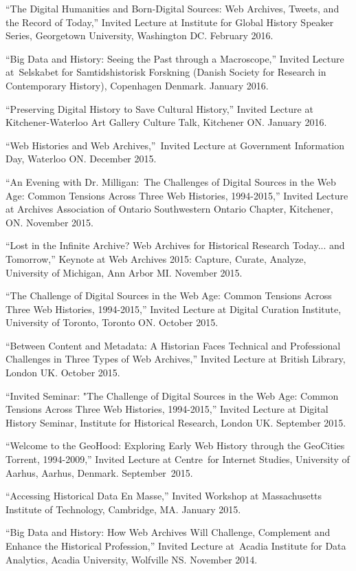 \documentclass[11pt,article,oneside]{memoir}
\begin{document}
\ind ``The Digital Humanities and Born-Digital Sources: Web Archives, Tweets, and the Record of Today,'' Invited Lecture at Institute for Global History Speaker Series, Georgetown University, Washington DC. February 2016.

\ind ``Big Data and History: Seeing the Past through a Macroscope,'' Invited Lecture at Selskabet for Samtidshistorisk Forskning (Danish Society for Research in Contemporary History), Copenhagen Denmark. January 2016. 

\ind ``Preserving Digital History to Save Cultural History,'' Invited Lecture at Kitchener-Waterloo Art Gallery Culture Talk, Kitchener ON. January 2016.

\ind ``Web Histories and Web Archives,'' Invited Lecture at Government Information Day, Waterloo ON. December 2015.

\ind ``An Evening with Dr. Milligan: The Challenges of Digital Sources in the Web Age: Common Tensions Across Three Web Histories, 1994-2015,'' Invited Lecture at Archives Association of Ontario Southwestern Ontario Chapter, Kitchener, ON. November 2015.

\ind ``Lost in the Infinite Archive? Web Archives for Historical Research Today... and Tomorrow,'' Keynote at Web Archives 2015: Capture, Curate, Analyze, University of Michigan, Ann Arbor MI. November 2015.

\ind ``The Challenge of Digital Sources in the Web Age: Common Tensions Across Three Web Histories, 1994-2015,'' Invited Lecture at Digital Curation Institute, University of Toronto, Toronto ON. October 2015.

\ind ``Between Content and Metadata: A Historian Faces Technical and Professional Challenges in Three Types of Web Archives,'' Invited Lecture at British Library, London UK. October 2015.

\ind ``Invited Seminar: "The Challenge of Digital Sources in the Web Age: Common Tensions Across Three Web Histories, 1994-2015,'' Invited Lecture at Digital History Seminar, Institute for Historical Research, London UK. September 2015. 

\ind ``Welcome to the GeoHood: Exploring Early Web History through the GeoCities Torrent, 1994-2009,'' Invited Lecture at Centre for Internet Studies, University of Aarhus, Aarhus, Denmark. September 2015.

\ind ``Accessing Historical Data En Masse,'' Invited Workshop at Massachusetts Institute of Technology, Cambridge, MA. January 2015.

\ind ``Big Data and History: How Web Archives Will Challenge, Complement and Enhance the Historical Profession,'' Invited Lecture at Acadia Institute for Data Analytics, Acadia University, Wolfville NS. November 2014.
\end{document}
